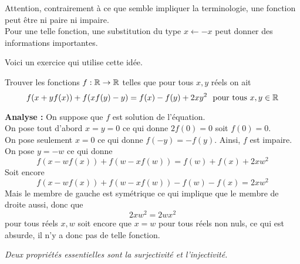 \begin{rem}
Attention, contrairement à ce que semble impliquer la terminologie, une fonction peut être ni paire ni impaire.
\\
Pour une telle fonction, une substitution du type $x\gets-x$ peut donner des informations importantes.
\end{rem}

Voici un exercice qui utilise cette idée.



\begin{exo}[M]
Trouver les fonctions $f:\mathbb R\to \mathbb R$ telles que pour tous $x,y$ réels on ait
$$f(x+yf(x)) +f(xf(y)-y) = f(x)-f(y)+2xy^2 \ \text{ pour tous } x, y \in \mathbb R$$
\end{exo}
\begin{preuve}
\textbf{Analyse :} On suppose que $f$ est solution de l'équation.
\\
On pose tout d'abord $x=y=0$
ce qui donne $2f(0)=0$ soit $f(0)=0$.
\\
On pose seulement $x=0$ ce qui donne $f(-y)=-f(y)$. Ainsi, $f$ est impaire.
\\
On pose $y=-w$ ce qui donne $$f(x-wf(x))+f(w-xf(w))=f(w)+f(x)+2xw^2$$
Soit encore $$f(x-wf(x))+f(w-xf(w))-f(w)-f(x)=2xw^2$$
Mais le membre de gauche est symétrique ce qui implique que le membre de droite aussi, donc que $$2xw^2=2wx^2$$ pour tous réels $x,w$ soit encore que $x=w$ pour tous réels non nuls, ce qui est absurde, il n'y a donc pas de telle fonction.
\end{preuve}

\emph{Deux propriétés essentielles sont la surjectivité et l'injectivité.}

